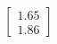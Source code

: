 \documentclass[preview]{standalone}
\begin{document}
\begin{align*}
\begin{bmatrix} 1.65 \\ 1.86 \end{bmatrix}
\end{align*}
\end{document}

